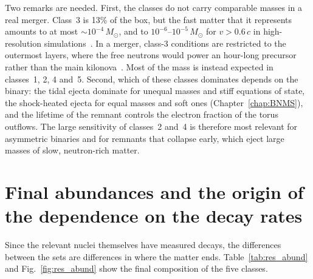 Two remarks are needed.
First, the classes do not carry comparable masses in a real merger.
Class~3 is 13\% of the box, but the fast matter that it represents amounts to at most $\sim10^{-4}\,M_\odot$, and to $10^{-6}$--$10^{-5}\,M_\odot$ for $v>0.6\,c$ in high-resolution simulations~\cite{metzger_neutron-powered_2015,radice_binary_2018}.
In a merger, class-3 conditions are restricted to the outermost layers, where the free neutrons would power an hour-long precursor rather than the main kilonova~\cite{metzger_neutron-powered_2015}.
Most of the mass is instead expected in classes~1, 2, 4 and~5.
Second, which of these classes dominates depends on the binary: the tidal ejecta dominate for unequal masses and stiff equations of state, the shock-heated ejecta for equal masses and soft ones (Chapter~\ref{chap:BNMS}), and the lifetime of the remnant controls the electron fraction of the torus outflows.
The large sensitivity of classes~2 and~4 is therefore most relevant for asymmetric binaries and for remnants that collapse early, which eject large masses of slow, neutron-rich matter.

\section{Final abundances and the origin of the dependence on the decay rates}\label{sec:res_origin}

Since the relevant nuclei themselves have measured decays, the differences between the sets are differences in where the matter ends.
Table~\ref{tab:res_abund} and Fig.~\ref{fig:res_abund} show the final composition of the five classes.

